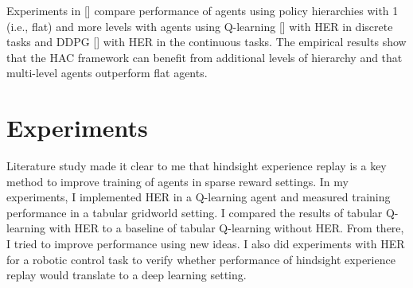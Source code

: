 \documentclass[conference]{IEEEtran}
\begin{document}
Experiments in [\cite{levy2019learning}] compare performance of agents using policy hierarchies with 1 (i.e., flat) and more levels with agents using Q-learning [\cite{watkins1992q}] with HER in discrete tasks and DDPG [\cite{lillicrap2015continuous}] with HER in the continuous tasks. The empirical results show that the HAC framework can benefit from additional levels of hierarchy and that multi-level agents outperform flat agents.

\section{Experiments} \label{sec:experiments}
Literature study made it clear to me that hindsight experience replay is a key method to improve training of agents in sparse reward settings. In my experiments, I implemented HER in a Q-learning agent and measured training performance in a tabular gridworld setting. I compared the results of tabular Q-learning with HER to a baseline of tabular Q-learning without HER. From there, I tried to improve performance using new ideas. I also did experiments with HER for a robotic control task to verify whether performance of hindsight experience replay would translate to a deep learning setting.
\end{document}
